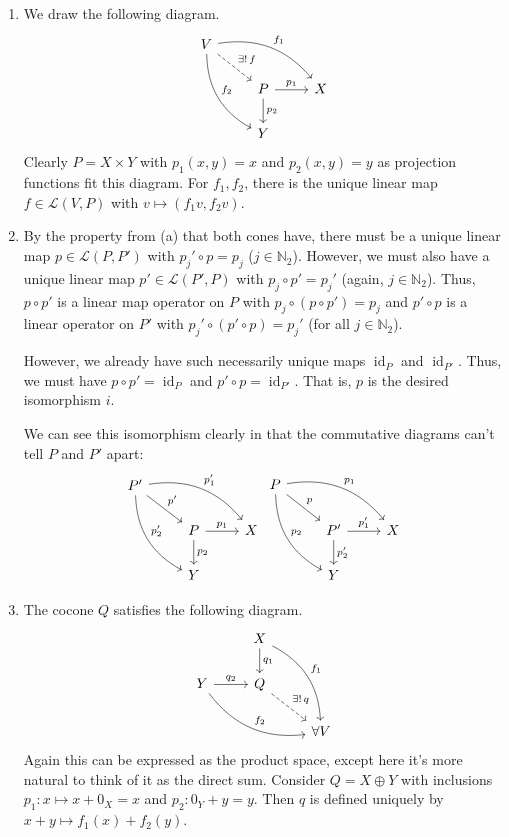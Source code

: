\documentclass[letterpaper, 12pt]{hmcpset}
\begin{document}
\begin{solution}
	\begin{enumerate}
		\item
			We draw the following diagram.
			\[
				\begin{tikzcd}
					V \ar[rrd, bend left, "f_1"] \ar[ddr, bend right, "f_2"] \ar[rd, dashrightarrow , "\exists ! \, f"] \\
					 & P \ar[r, "p_1"] \ar[d, "p_2"] & X \\
					 & Y 
				\end{tikzcd}
			\]
			Clearly $P = X \times Y$ with $p_1(x, y) = x$ and $p_2(x, y) = y$ as projection functions fit this diagram. For $f_1, f_2$, there is the unique linear map $f \in \mathcal L(V, P)$ with $v \mapsto (f_1 v, f_2 v)$.
		\item
			By the property from (a) that both cones have, there must be a unique linear map $p \in \mathcal L(P, P')$ with $p_j' \circ p = p_j$ ($j \in \mathbb N_2$). However, we must also have a unique linear map $p' \in \mathcal L(P', P)$ with $p_j \circ p' = p_j'$ (again, $j \in \mathbb N_2$). Thus, $p \circ p'$ is a linear map operator on $P$ with $p_j \circ (p \circ p') = p_j$ and $p' \circ p$ is a linear operator on $P'$ with $p_j' \circ (p' \circ p) = p_j'$ (for all $j \in \mathbb N_2$).

			However, we already have such necessarily unique maps $\operatorname{id}_P$ and $\operatorname{id}_{P'}$. Thus, we must have $p \circ p' = \operatorname{id}_P$ and $p' \circ p = \operatorname{id}_{P'}$. That is, $p$ is the desired isomorphism $i$.

			We can see this isomorphism clearly in that the commutative diagrams can't tell $P$ and $P'$ apart:
			\[
				\begin{tikzcd}
					 P' \ar[rrd, bend left, "p_1'"] \ar[ddr, bend right, "p_2'"] \ar[rd, "p'"] \\
					 & P \ar[r, "p_1"] \ar[d, "p_2"] & X \\
					 & Y 
				\end{tikzcd}
				\begin{tikzcd}
					 P \ar[rrd, bend left, "p_1"] \ar[ddr, bend right, "p_2"] \ar[rd, "p"] \\
					 & P' \ar[r, "p_1'"] \ar[d, "p_2'"] & X \\
					 & Y 
				\end{tikzcd}
			\]

		\item
			The cocone $Q$ satisfies the following diagram.
			\[
				\begin{tikzcd}
						          & X \ar[d, "q_{1}"] \ar[rdd, "f_{1}", bend left] \\
					Y \ar[r, "q_{2}"] \ar[rrd, bend right, "f_{2}"] & Q \ar[rd, "\exists ! \, q", dashrightarrow] \\
							  & & \forall V 
				\end{tikzcd}
			\]
			Again this can be expressed as the product space, except here it's more natural to think of it as the direct sum. Consider $Q = X \oplus Y$ with inclusions $p_{1} : x \mapsto x + 0_{X} = x$ and $p_{2} : 0_{Y} + y = y$. Then $q$ is defined uniquely by $x + y \mapsto f_{1}(x) + f_{2}(y)$.
			

\end{enumerate}
\end{solution}
\end{document}
